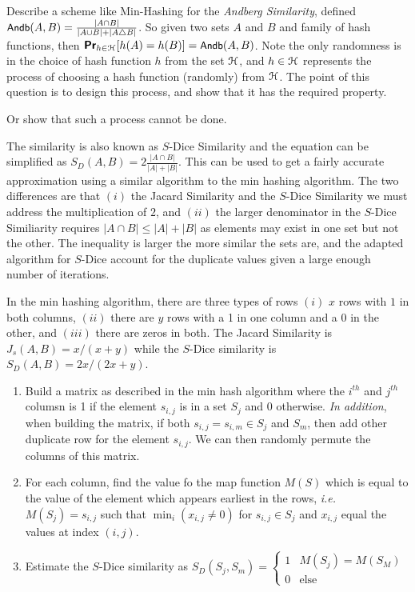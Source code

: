 \documentclass[11pt]{article}
\newcommand{\Andb}{\ensuremath{\textsf{\small Andb}}}
\begin{document}
Describe a scheme like Min-Hashing for the \emph{Andberg Similarity}, defined $\Andb(A,B) = \frac{|A \cap B|}{|A \cup B| + |A \triangle B|}$.  So given two sets $A$ and $B$ and family of hash functions, then $\Pr_{h \in \Eu{H}}[h(A) = h(B)] = \Andb(A,B)$.  Note the only randomness is in the choice of hash function $h$ from the set $\EuScript{H}$, and $h \in \EuScript{H}$ represents the process of choosing a hash function (randomly) from $\EuScript{H}$.  The point of this question is to design this process, and show that it has the required property.  

Or show that such a process cannot be done.  

The similarity is also known as $S$-Dice Similarity and the equation can be simplified as $S_{D}(A,B) = 2\frac{| A \cap B |}{|A| + |B|}$. This can be used to get a fairly accurate approximation using a similar algorithm to the min hashing algorithm. The two differences are that $(i)$ the Jacard Similarity and the $S$-Dice Similarity we must address the multiplication of $2$, and $(ii)$ the larger denominator in the $S$-Dice Similiarity requires $|A \cap B| \leq |A| + |B|$ as elements may exist in one set but not the other. The inequality is larger the more similar the sets are, and the adapted algorithm for $S$-Dice account for the duplicate values given a large enough number of iterations.

In the min hashing algorithm, there are three types of rows $(i)$ $x$ rows with $1$ in both columns, $(ii)$ there are $y$ rows with a 1 in one column and a 0 in the other, and $(iii)$ there are zeros in both. The Jacard Similarity is $J_{s}(A,B) = x/(x+y)$ while the $S$-Dice similarity is $S_{D}(A,B) = 2x/(2x+y)$.

\begin{enumerate}
  \item Build a matrix as described in the min hash algorithm where the $i^{th}$ and $j^{th}$ columsn is 1 if the element $s_{i,j}$ is in a set $S_{j}$ and 0 otherwise. {\em In addition}, when building the matrix, if both $s_{i,j} = s_{i,m} \in S_{j}$ and $S_{m}$, then add other duplicate row for the element $s_{i,j}$. We can then randomly permute the columns of this matrix.
    \item For each column, find the value fo the map function $M(S)$ which is equal to the value of the element which appears earliest in the rows, {\em i.e.} $M(S_{j}) = s_{i,j}$ such that $\min_{i}(x_{i,j} \neq 0)$ for $s_{i,j} \in S_{j}$ and $x_{i,j}$ equal the values at index $(i,j)$.
      \item Estimate the $S$-Dice similarity as $S_{D}(S_{j},S_{m}) = \left\{ \begin{array}{ll}1 & M(S_{j}) = M(S_{M})\\0 & \text{else}\end{array}\right.$
\end{enumerate}
\end{document}
